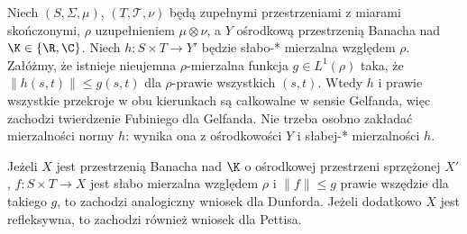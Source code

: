 \begin{stwierdzenie}
\label{prop:weak-fubini-separable15b}
Niech $(S,\Sigma,\mu)$, $(T,\mathcal T,\nu)$ będą
zupełnymi przestrzeniami z miarami skończonymi,
$\rho$ uzupełnieniem $\mu\otimes\nu$, a $Y$ ośrodkową
przestrzenią Banacha nad $\K\in\{\R,\C\}$.
Niech $h:S\times T\to Y'$ będzie słabo-* mierzalna
względem $\rho$. Załóżmy, że istnieje nieujemna
$\rho$-mierzalna funkcja $g\in L^1(\rho)$ taka, że
$\|h(s,t)\|\le g(s,t)$ dla $\rho$-prawie wszystkich
$(s,t)$. Wtedy $h$ i prawie wszystkie przekroje
w obu kierunkach są całkowalne w sensie Gelfanda,
więc zachodzi twierdzenie Fubiniego dla Gelfanda.
Nie trzeba osobno zakładać mierzalności normy $h$:
wynika ona z ośrodkowości $Y$ i słabej-* mierzalności $h$.

Jeżeli $X$ jest przestrzenią Banacha nad $\K$
o ośrodkowej przestrzeni sprzężonej $X'$,
$f:S\times T\to X$ jest słabo mierzalna względem $\rho$
i $\|f\|\le g$ prawie wszędzie dla takiego $g$,
to zachodzi analogiczny wniosek dla Dunforda.
Jeżeli dodatkowo $X$ jest refleksywna, to zachodzi
również wniosek dla Pettisa.
\end{stwierdzenie}
